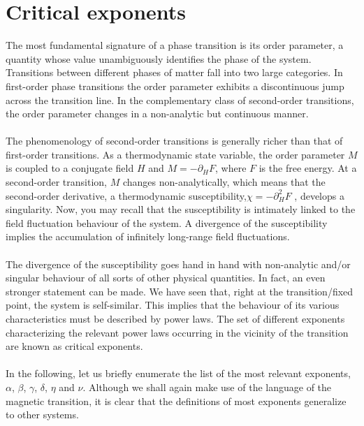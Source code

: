 \section{Critical exponents}
The most fundamental signature of a phase transition is its order parameter, a quantity whose value unambiguously identifies the phase of the system. Transitions between different phases of matter fall into two large categories. 
In first-order phase transitions the order parameter exhibits a discontinuous jump across the transition line.
In the complementary class of second-order transitions, the order parameter changes in a non-analytic but continuous manner.
\\ \\
The phenomenology of second-order transitions is generally richer than that of first-order transitions. 
As a thermodynamic state variable, the order parameter $M$ is coupled to a conjugate field $H$ and $M = -\partial_H F$, where $F$ is the free energy. 
At a second-order transition, $M$ changes non-analytically, which means that the second-order derivative, a thermodynamic susceptibility,$\chi = -\partial_H^2 F$ , develops a singularity. 
Now, you may recall that the susceptibility is intimately linked to the field fluctuation behaviour of the system. A divergence of the susceptibility implies the accumulation of infinitely long-range field fluctuations.
\\ \\
The divergence of the susceptibility goes hand in hand with non-analytic and/or singular behaviour of all sorts of other physical quantities. In fact, an even stronger statement can be made.
We have seen that, right at the transition/fixed point, the system is self-similar. This implies that the behaviour of its various characteristics must be described by power laws.
The set of different exponents characterizing the relevant power laws occurring in the vicinity of the transition are known as critical exponents.
\\ \\
In the following, let us briefly enumerate the list of the most relevant exponents, $\alpha$, $\beta$, $\gamma$, $\delta$, $\eta$ and $\nu$. 
Although we shall again make use of the language of the magnetic transition, it is clear that the definitions of most exponents generalize to other systems.
